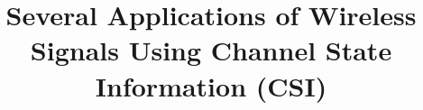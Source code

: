 \documentclass[conference]{IEEEtran}
\begin{document}
\title{Several Applications of Wireless Signals Using Channel State Information (CSI)}


\end{document}
